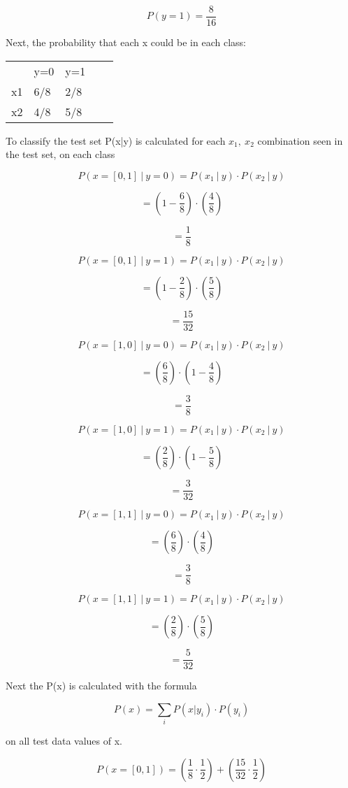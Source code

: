 \documentclass{article}
\begin{document}
$$ P(y=1) = \frac{8}{16} $$

Next, the probability that each x could be in each class:

\begin{table}[h]
\begin{tabular}{lllll}
       &   y=0 &  y=1 \\
   x1  &  6/8  &  2/8\\
   x2  &  4/8  &  5/8
\end{tabular}
\end{table}

To classify the test set P(x|y) is calculated for each $x_1,\ x_2$ combination seen in the test set, on each class

$$ P(x=[0,1]\ |\ y=0) = P(x_1\ |\ y)\cdot P(x_2\ |\ y)$$

$$ = \left(1 - \frac{6}{8}\right)\cdot \left(\frac{4}{8}\right) $$

$$ = \frac{1}{8} $$

$$ P(x=[0,1]\ |\ y=1) = P(x_1\ |\ y)\cdot P(x_2\ |\ y)$$

$$ = \left(1 - \frac{2}{8}\right)\cdot \left(\frac{5}{8}\right) $$

$$ = \frac{15}{32} $$

$$ P(x=[1,0]\ |\ y=0) = P(x_1\ |\ y)\cdot P(x_2\ |\ y)$$

$$ = \left(\frac{6}{8}\right)\cdot \left(1 - \frac{4}{8}\right) $$

$$ = \frac{3}{8} $$

$$ P(x=[1,0]\ |\ y=1) = P(x_1\ |\ y)\cdot P(x_2\ |\ y)$$

$$ = \left(\frac{2}{8}\right)\cdot \left(1 - \frac{5}{8}\right) $$

$$ = \frac{3}{32} $$

$$ P(x=[1,1]\ |\ y=0) = P(x_1\ |\ y)\cdot P(x_2\ |\ y)$$

$$ = \left(\frac{6}{8}\right)\cdot \left(\frac{4}{8}\right) $$

$$ = \frac{3}{8} $$

$$ P(x=[1,1]\ |\ y=1) = P(x_1\ |\ y)\cdot P(x_2\ |\ y)$$

$$ = \left(\frac{2}{8}\right)\cdot \left(\frac{5}{8}\right) $$

$$ = \frac{5}{32} $$

Next the P(x) is calculated with the formula

$$ P(x) = \sum_i P(x|y_i)\cdot P(y_i) $$

on all test data values of x.

$$ P(x = [0,1]) = \left(\frac{1}{8} \cdot \frac{1}{2}\right) + \left(\frac{15}{32} \cdot \frac{1}{2}\right) $$
\end{document}
